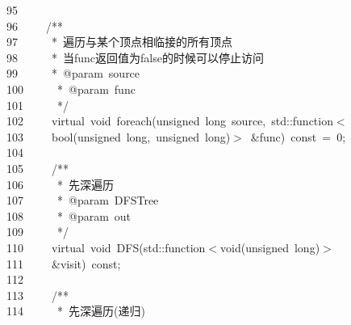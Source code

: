 \documentclass{ctexart}
\newcommand{\hlstd}[1]{\textcolor[rgb]{0.2,0.2,0.2}{#1}}
\newcommand{\hlnum}[1]{\textcolor[rgb]{0.06,0.58,0.63}{#1}}
\newcommand{\hlcom}[1]{\textcolor[rgb]{0.59,0.59,0.59}{#1}}
\newcommand{\hlopt}[1]{\textcolor[rgb]{0.2,0.2,0.2}{#1}}
\newcommand{\hllin}[1]{\textcolor[rgb]{0.59,0.59,0.59}{#1}}
\newcommand{\hlkwb}[1]{\textcolor[rgb]{0.63,0,0.31}{#1}}
\newcommand{\hlkwc}[1]{\textcolor[rgb]{0,0.63,0.31}{#1}}
\newcommand{\hlkwd}[1]{\textcolor[rgb]{0.78,0.23,0.41}{#1}}
\begin{document}
\hllin{95\ }\hlstd{}\\
\hllin{96\ }\hlstd{}\hlstd{\ \ \ \ }\hlstd{}\hlcom{/{*}{*}}\\
\hllin{97\ }\hlcom{}\hlstd{\ \ \ \ \ }\hlcom{{*}\ 遍历与某个顶点相临接的所有顶点}\\
\hllin{98\ }\hlcom{}\hlstd{\ \ \ \ \ }\hlcom{{*}\ 当func返回值为false的时候可以停止访问}\\
\hllin{99\ }\hlcom{}\hlstd{\ \ \ \ \ }\hlcom{{*}\ @param\ source}\\
\hllin{100\ }\hlcom{}\hlstd{\ \ \ \ \ }\hlcom{{*}\ @param\ func}\\
\hllin{101\ }\hlcom{}\hlstd{\ \ \ \ \ }\hlcom{{*}/}\hlstd{}\\
\hllin{102\ }\hlstd{}\hlstd{\ \ \ \ }\hlstd{}\hlkwc{virtual\ }\hlstd{}\hlkwb{void\ }\hlstd{}\hlkwd{foreach}\hlstd{}\hlopt{(}\hlstd{}\hlkwb{unsigned\ long\ }\hlstd{source}\hlopt{,\ }\hlstd{}\hlkwc{std}\hlstd{}\hlopt{::}\hlstd{function}\hlopt{$<$}\Righttorque\\
\hllin{103\ }\hlstd{}\hlstd{\ \ \ \ }\hlstd{}\hlkwb{bool}\hlstd{}\hlopt{(}\hlstd{}\hlkwb{unsigned\ long}\hlstd{}\hlopt{,\ }\hlstd{}\hlkwb{unsigned\ long}\hlstd{}\hlopt{)$>$\ \&}\hlstd{func}\hlopt{)\ }\hlstd{}\hlkwb{const\ }\hlstd{}\hlopt{=\ }\hlstd{}\hlnum{0}\hlstd{}\hlopt{;}\\
\hllin{104\ }\hlstd{}\\
\hllin{105\ }\hlstd{}\hlstd{\ \ \ \ }\hlstd{}\hlcom{/{*}{*}}\\
\hllin{106\ }\hlcom{}\hlstd{\ \ \ \ \ }\hlcom{{*}\ 先深遍历}\\
\hllin{107\ }\hlcom{}\hlstd{\ \ \ \ \ }\hlcom{{*}\ @param\ DFSTree}\\
\hllin{108\ }\hlcom{}\hlstd{\ \ \ \ \ }\hlcom{{*}\ @param\ out}\\
\hllin{109\ }\hlcom{}\hlstd{\ \ \ \ \ }\hlcom{{*}/}\hlstd{}\\
\hllin{110\ }\hlstd{}\hlstd{\ \ \ \ }\hlstd{}\hlkwc{virtual\ }\hlstd{}\hlkwb{void\ }\hlstd{}\hlkwd{DFS}\hlstd{}\hlopt{(}\hlstd{}\hlkwc{std}\hlstd{}\hlopt{::}\hlstd{function}\hlopt{$<$}\hlstd{}\hlkwb{void}\hlstd{}\hlopt{(}\hlstd{}\hlkwb{unsigned\ long}\hlstd{}\hlopt{)$>$\ }\Righttorque\\
\hllin{111\ }\hlstd{}\hlstd{\ \ \ \ }\hlstd{}\hlopt{\&}\hlstd{visit}\hlopt{)\ }\hlstd{}\hlkwb{const}\hlstd{}\hlopt{;}\\
\hllin{112\ }\hlstd{}\\
\hllin{113\ }\hlstd{}\hlstd{\ \ \ \ }\hlstd{}\hlcom{/{*}{*}}\\
\hllin{114\ }\hlcom{}\hlstd{\ \ \ \ \ }\hlcom{{*}\ 先深遍历(递归)}\\
\end{document}
